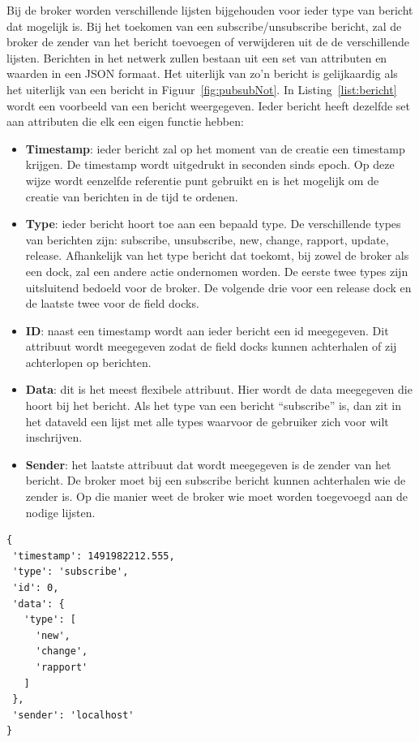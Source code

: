 Bij de broker worden verschillende lijsten bijgehouden voor ieder type van bericht dat mogelijk is.
Bij het toekomen van een subscribe/unsubscribe bericht, zal de broker de zender van het bericht toevoegen of verwijderen uit de de verschillende lijsten.
Berichten in het netwerk zullen bestaan uit een set van attributen en waarden in een JSON formaat.
Het uiterlijk van zo'n bericht is gelijkaardig als het uiterlijk van een bericht in Figuur~\ref{fig:pubsubNot}.
In Listing~\ref{list:bericht} wordt een voorbeeld van een bericht weergegeven.
Ieder bericht heeft dezelfde set aan attributen die elk een eigen functie hebben:
\begin{itemize}
\item \textbf{Timestamp}: ieder bericht zal op het moment van de creatie een timestamp krijgen.
De timestamp wordt uitgedrukt in seconden sinds epoch.
Op deze wijze wordt eenzelfde referentie punt gebruikt en is het mogelijk om de creatie van berichten in de tijd te ordenen.
\item \textbf{Type}: ieder bericht hoort toe aan een bepaald type.
De verschillende types van berichten zijn: subscribe, unsubscribe, new, change, rapport, update, release.
Afhankelijk van het type bericht dat toekomt, bij zowel de broker als een dock, zal een andere actie ondernomen worden.
De eerste twee types zijn uitsluitend bedoeld voor de broker.
De volgende drie voor een release dock en de laatste twee voor de field docks.
\item \textbf{ID}: naast een timestamp wordt aan ieder bericht een id meegegeven. 
Dit attribuut wordt meegegeven zodat de field docks kunnen achterhalen of zij achterlopen op berichten.
\item \textbf{Data}: dit is het meest flexibele attribuut. 
Hier wordt de data meegegeven die hoort bij het bericht.
Als het type van een bericht ``subscribe'' is, dan zit in het dataveld een lijst met alle types waarvoor de gebruiker zich voor wilt inschrijven.
\item \textbf{Sender}: het laatste attribuut dat wordt meegegeven is de zender van het bericht.
De broker moet bij een subscribe bericht kunnen achterhalen wie de zender is.
Op die manier weet de broker wie moet worden toegevoegd aan de nodige lijsten.
\end{itemize}

\begin{minipage}{\linewidth}
\begin{center}
\begin{lstlisting}[caption={Formaat voor een bericht},captionpos=b,label={list:bericht}, xleftmargin=.3\textwidth]
{
 'timestamp': 1491982212.555,
 'type': 'subscribe',
 'id': 0,
 'data': {
   'type': [
     'new',
     'change',
     'rapport'
   ]
 },
 'sender': 'localhost'
}
\end{lstlisting}
\end{center}
\end{minipage}

